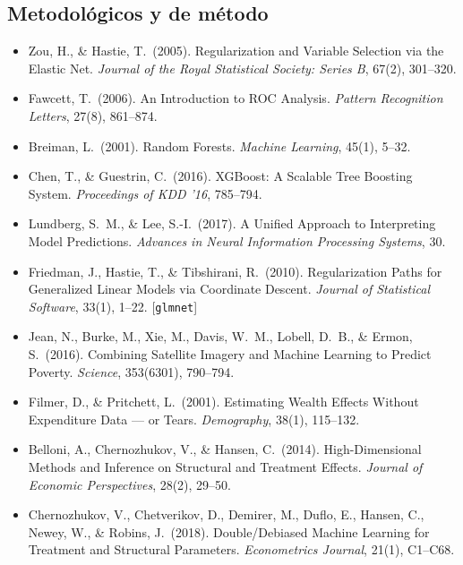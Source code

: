 \documentclass[12pt,a4paper]{article}
\begin{document}
\subsection*{Metodológicos y de método}
\begin{itemize}
    \item Zou, H., \& Hastie, T.\ (2005). Regularization and Variable Selection via the Elastic Net. \textit{Journal of the Royal Statistical Society: Series B}, 67(2), 301--320.
    \item Fawcett, T.\ (2006). An Introduction to ROC Analysis. \textit{Pattern Recognition Letters}, 27(8), 861--874.
    \item Breiman, L.\ (2001). Random Forests. \textit{Machine Learning}, 45(1), 5--32.
    \item Chen, T., \& Guestrin, C.\ (2016). XGBoost: A Scalable Tree Boosting System. \textit{Proceedings of KDD '16}, 785--794.
    \item Lundberg, S.\ M., \& Lee, S.-I.\ (2017). A Unified Approach to Interpreting Model Predictions. \textit{Advances in Neural Information Processing Systems}, 30.
    \item Friedman, J., Hastie, T., \& Tibshirani, R.\ (2010). Regularization Paths for Generalized Linear Models via Coordinate Descent. \textit{Journal of Statistical Software}, 33(1), 1--22. [\texttt{glmnet}]
    \item Jean, N., Burke, M., Xie, M., Davis, W.\ M., Lobell, D.\ B., \& Ermon, S.\ (2016). Combining Satellite Imagery and Machine Learning to Predict Poverty. \textit{Science}, 353(6301), 790--794.
    \item Filmer, D., \& Pritchett, L.\ (2001). Estimating Wealth Effects Without Expenditure Data --- or Tears. \textit{Demography}, 38(1), 115--132.
    \item Belloni, A., Chernozhukov, V., \& Hansen, C.\ (2014). High-Dimensional Methods and Inference on Structural and Treatment Effects. \textit{Journal of Economic Perspectives}, 28(2), 29--50.
    \item Chernozhukov, V., Chetverikov, D., Demirer, M., Duflo, E., Hansen, C., Newey, W., \& Robins, J.\ (2018). Double/Debiased Machine Learning for Treatment and Structural Parameters. \textit{Econometrics Journal}, 21(1), C1--C68.
\end{itemize}
\end{document}
